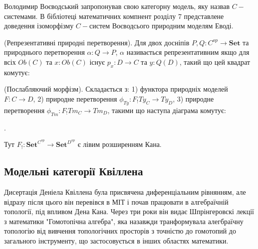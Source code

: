 Володимир Воєводський запропонував свою категорну модель, яку назвав $C-$системами.
В бібліотеці математичних компнент розділу 7 представлене доведення ізоморфізму $C-$систем
Воєводсього природним моделям Еводі.

\begin{definition} (Репрезентативні природні перетворення).
Для двох досніпів $P,Q : C^{op} \rightarrow \textbf{Set}$ та природнього
перетворення $\alpha : Q \rightarrow P$, $\alpha$ називається репрезентативним
якщо для всіх $Ob(C)$ та $x : Ob(C)$ існує $p_x : D \rightarrow C$ та $y : Q(D)$,
такий що цей квадрат комутує:
\begin{center}
\end{center}
\end{definition}

\begin{definition} (Послабляючий морфізм). Складається з:
1) функтора природніх моделей $F: C \rightarrow D$,
2) природне перетворення $\phi_{Ty} : F_! Ty_C \rightarrow Ty_D$,
3) природне перетворення $\phi_{Tm} : F_! Tm_C \rightarrow Tm_D$,
такими що наступа діаграма комутує:
\begin{center}
\end{center}.

Тут $F_! : \textbf{Set}^{C^{op}} \rightarrow \textbf{Set}^{D^{op}}$ є лівим розширенням Кана.
\end{definition}

\newpage
\subsection{Модельні категорії Квіллена}
Дисертація Деніела Квіллена була присвячена диференціальним рівнянням, але відразу після цього він
перевівся в МІТ і почав працювати в алгебраїчній топології, під впливом Дена Кана.
Через три роки він видає Шпрінгеровскі лекції з математики "Гомотопічна алгебра", яка
назавжди транформувала алегбраїчну топологію від вивчення топологічних просторів з точністю до гомотопий
до загального інструменту, що застосовується в інших областях математики.

